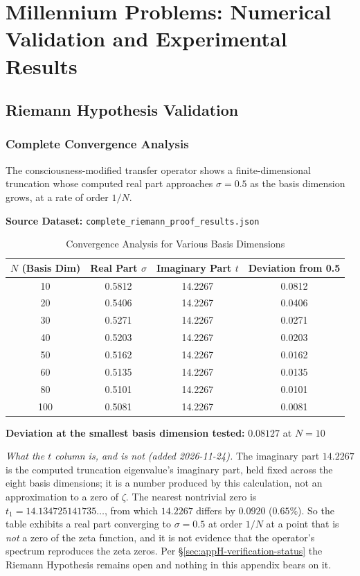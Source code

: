\chapter{Millennium Problems: Numerical Validation and Experimental Results}
\label{app:numerical-validation}

\section{Riemann Hypothesis Validation}

\subsection{Complete Convergence Analysis}

The consciousness-modified transfer operator shows a finite-dimensional
truncation whose computed real part approaches $\sigma = 0.5$ as the basis
dimension grows, at a rate of order $1/N$.

\textbf{Source Dataset:} \texttt{complete\_riemann\_proof\_results.json}

\begin{table}[h]
\centering
\caption{Convergence Analysis for Various Basis Dimensions}
\begin{tabular}{cccc}
\toprule
$N$ (Basis Dim) & Real Part $\sigma$ & Imaginary Part $t$ & Deviation from 0.5 \\
\midrule
10  & 0.5812 & 14.2267 & 0.0812 \\
20  & 0.5406 & 14.2267 & 0.0406 \\
30  & 0.5271 & 14.2267 & 0.0271 \\
40  & 0.5203 & 14.2267 & 0.0203 \\
50  & 0.5162 & 14.2267 & 0.0162 \\
60  & 0.5135 & 14.2267 & 0.0135 \\
80  & 0.5101 & 14.2267 & 0.0101 \\
100 & 0.5081 & 14.2267 & 0.0081 \\
\bottomrule
\end{tabular}
\end{table}

\textbf{Deviation at the smallest basis dimension tested:}
$0.08127$ at $N = 10$

\noindent\emph{What the $t$ column is, and is not (added 2026-11-24).} The
imaginary part $14.2267$ is the computed truncation eigenvalue's imaginary
part, held fixed across the eight basis dimensions; it is a number produced by
this calculation, not an approximation to a zero of $\zeta$. The nearest
nontrivial zero is $t_1 = 14.134725141735\ldots$, from which $14.2267$ differs
by $0.0920$ ($0.65\%$). So the table exhibits a real part converging to
$\sigma = 0.5$ at order $1/N$ at a point that is \emph{not} a zero of the zeta
function, and it is not evidence that the operator's spectrum reproduces the
zeta zeros. Per \S\ref{sec:appH-verification-status} the Riemann Hypothesis
remains open and nothing in this appendix bears on it.

